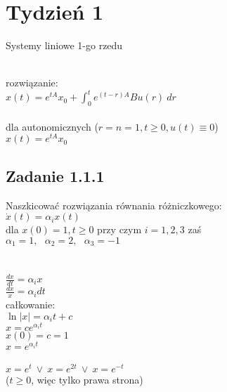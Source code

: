 \pagebreak
\section*{Tydzień 1}
Systemy liniowe 1-go rzedu\\
\begin{figure}[!h]
\end{figure}
\\
rozwiązanie:\\
$x(t)=e^{tA}x_0+\int^t_0e^{(t-r)A}Bu(r) \ dr$\\
\\
dla autonomicznych ($r=n=1, t\geqslant 0, u(t)\equiv 0$)\\
$x(t)=e^{tA}x_0$\\





\pagebreak
\subsection*{Zadanie 1.1.1} {\color{darkgray}
	Naszkicować rozwiązania równania różniczkowego:\\
	$\dot{x}(t)=\alpha_ix(t)$\\
	dla $x(0)=1, t\geqslant 0$ przy czym $i=1,2,3$ zaś\\
	$\alpha_1=1,  \ \ \ \alpha_2=2, \ \ \ \alpha_3=-1$\\
}\lineh
\\\\
{\color{lightgray}
$\frac{dx}{dt}=\alpha_ix$\\
$\frac{dx}{x}=\alpha_idt$\\
całkowanie:\\
$\ln|x|=\alpha_i t+{c}$\\
}
$x=ce^{\alpha_it}$\\
$x(0)=c=1$\\
$x=e^{\alpha_it}$\\
\\
$x=e^t \ \vee \ x=e^{2t} \ \vee \ x=e^{-t}$\\
($t\geqslant 0$, więc tylko prawa strona)\\

